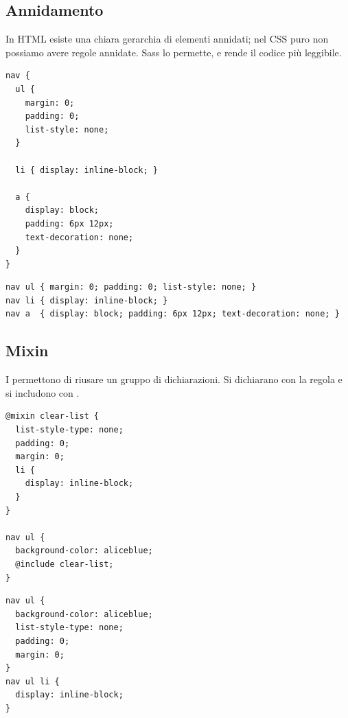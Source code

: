 \subsection{Annidamento}

In HTML esiste una chiara gerarchia di elementi annidati; nel CSS puro non
possiamo avere regole annidate. Sass lo permette, e rende il codice più
leggibile.

\begin{affianco}[0.36]
\begin{lstlisting}[style=css, name=nesting.scss]
nav {
  ul {
    margin: 0;
    padding: 0;
    list-style: none;
  }

  li { display: inline-block; }

  a {
    display: block;
    padding: 6px 12px;
    text-decoration: none;
  }
}
\end{lstlisting}
\risultato
\begin{lstlisting}[style=css, name=nesting.css]
nav ul { margin: 0; padding: 0; list-style: none; }
nav li { display: inline-block; }
nav a  { display: block; padding: 6px 12px; text-decoration: none; }
\end{lstlisting}
\end{affianco}


\subsection{Mixin}

I  permettono di riusare un gruppo di dichiarazioni. Si dichiarano
con la regola  e si includono con .

\begin{affianco}[0.45]
\begin{lstlisting}[style=css, name=mixins.scss]
@mixin clear-list {
  list-style-type: none;
  padding: 0;
  margin: 0;
  li {
    display: inline-block;
  }
}

nav ul {
  background-color: aliceblue;
  @include clear-list;
}
\end{lstlisting}
\risultato
\begin{lstlisting}[style=css, name=CSS generato]
nav ul {
  background-color: aliceblue;
  list-style-type: none;
  padding: 0;
  margin: 0;
}
nav ul li {
  display: inline-block;
}
\end{lstlisting}
\begin{browser}[nav]
  \colorbox{css-aliceblue}{}
\end{browser}
\end{affianco}

